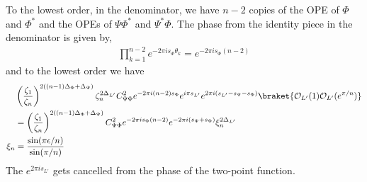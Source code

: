 \documentclass[11pt]{article}
\newcommand{\ep}{\epsilon}
\newcommand{\mO}{\mathcal{O}}
\newcommand{\nn}{\nonumber}
\newcommand{\lb}{\left(}
\newcommand{\rb}{\right)}
\newcommand{\JM}[1]{\textcolor{orange}{#1}}
\begin{document}
To the lowest order, in the denominator, we have $n-2$ copies of the OPE of $\Phi$ and $\Phi^*$ and the OPEs of $\Psi\Phi^*$ and $\Psi^*\Phi$. 
The phase from the identity piece in the denominator is given by,
\begin{align}
  \prod_{k=1}^{n-2}e^{-2\pi i s_\Phi\theta_k}=e^{-2\pi i s_\Phi(n-2)}
\end{align}
and to the lowest order we have
\begin{align}
  &\lb \frac{\zeta_1}{\zeta_n}\rb^{2((n-1)\Delta_\Phi+\Delta_\Psi)}\zeta_n^{2\Delta_{L'}}C_{\Psi\Phi}^2 e^{-2\pi i (n-2)s_\Phi} e^{i\pi s_{L'}}e^{2 \pi i (s_{L'} - s_\Psi - s_\Phi)}\braket{\mO_{L'}(1)\mO_{L'}(e^{\pi/n})}\nn\\
  &=\lb \frac{\zeta_1}{\zeta_n}\rb^{2((n-1)\Delta_\Phi+\Delta_\Psi)}C_{\Psi\Phi}^2e^{-2\pi i s_\Phi(n-2)}e^{-2 \pi i( s_\Psi + s_\Phi)}\xi_n^{2\Delta_{L'}}\nn\\
  \xi_n&=\frac{\sin(\pi \ep/n)}{\sin(\pi/n)}
\end{align}
The $e^{2\pi i s_{L'}}$ gets cancelled from the phase of the two-point function.
\end{document}
